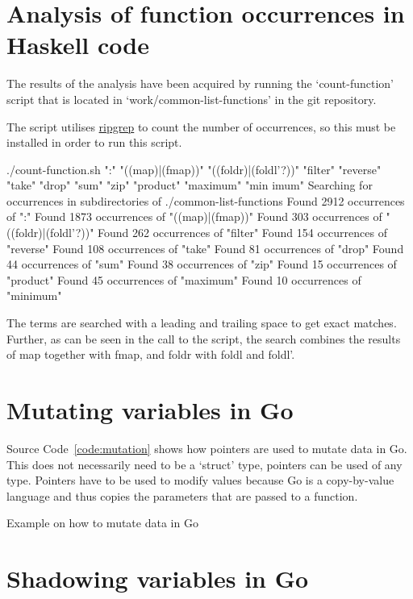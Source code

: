 \section{Analysis of function occurrences in Haskell code}\label{appendix:function-occurrences}
The results of the analysis have been acquired by running the `count-function' script
that is located in `work/common-list-functions' in the git repository\autocite{git-repo}.

The script utilises \href{https://github.com/BurntSushi/ripgrep}{ripgrep} to count the number of occurrences, so
this must be installed in order to run this script.

\begin{bashcode}
./count-function.sh ":" "((map)|(fmap))" "((foldr)|(foldl'?))" "filter" "reverse" "take" "drop" "sum" "zip" "product" "maximum" "min
imum"
Searching for occurrences in subdirectories of ./common-list-functions
Found 2912 occurrences of ":"
Found 1873 occurrences of "((map)|(fmap))"
Found 303 occurrences of "((foldr)|(foldl'?))"
Found 262 occurrences of "filter"
Found 154 occurrences of "reverse"
Found 108 occurrences of "take"
Found 81 occurrences of "drop"
Found 44 occurrences of "sum"
Found 38 occurrences of "zip"
Found 15 occurrences of "product"
Found 45 occurrences of "maximum"
Found 10 occurrences of "minimum"
\end{bashcode}

The terms are searched with a leading and trailing space to get exact matches. Further, as can be seen in
the call to the script, the search combines the results of map together with fmap, and foldr with foldl
and foldl'.

\section{Mutating variables in Go}\label{appendix:mutation}

Source Code~\ref{code:mutation} shows how pointers are used to mutate data in Go. This does
not necessarily need to be a `struct' type, pointers can be used of any type.
Pointers have to be used to modify values because Go is a copy-by-value language and thus
copies the parameters that are passed to a function.

\begin{code}
	\caption{Example on how to mutate data in Go}\label{code:mutation}
\end{code}

\section{Shadowing variables in Go}\label{appendix:shadowing}

